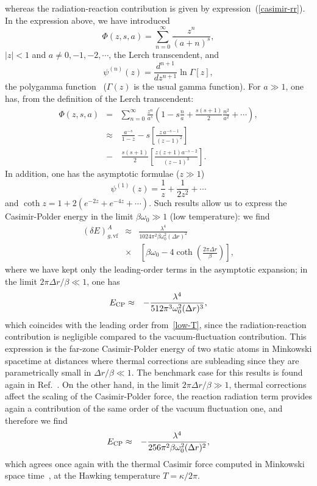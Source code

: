 \documentclass[twocolumn,prd,aps,showpacs,amsmath,amssymb]{revtex4-1}
\def\beq{\begin{equation}}
\def\eeq{\end{equation}}
\def\bea{\begin{eqnarray}}
\def\eea{\end{eqnarray}}
\def\nn{\nonumber}
\begin{document}
whereas the radiation-reaction contribution is given by
expression~(\ref{casimir-rr}). In the expression above, we have introduced
$$
\Phi(z,s,a) = \sum_{n=0}^{\infty}\frac{z^{n}}{(a+n)^s},
$$
$|z| < 1$ and $a \neq 0, -1, -2, \cdots$,  the Lerch transcendent, and
$$
\psi^{(n)}(z) = \frac{d^{n+1}}{dz^{n+1}} \ln \Gamma[z],
$$
 the polygamma function~\cite{abram} ($\Gamma(z)$ is the usual gamma function). For $a \gg 1$, one has, from the definition of the Lerch transcendent:
%
\bea
\Phi(z,s,a) &=& \sum_{n=0}^{\infty}\frac{z^{n}}{a^s}\left(1 - s\frac{n}{a} + \frac{s(s+1)}{2}\frac{n^2}{a^2} + \cdots \right),
\nn\\
&\approx&\,\frac{a^{-s}}{1-z} - s\left[\frac{z\,a^{-s-1}}{(z-1)^2}\right] 
\nn\\
&-&\, \frac{s(s+1)}{2}\left[\frac{z (z+1)a^{-s-2}}{(z-1)^3}\right].
\eea
%
In addition, one has the asymptotic formulae ($z \gg 1$)
%
\beq
\psi^{(1)}(z) = \frac{1}{z} + \frac{1}{2z^2} + \cdots
\eeq
%
and $\coth z = 1 + 2 (e^{-2z} + e^{-4z} + \cdots)$. Such results allow
us to express the Casimir-Polder energy in the limit $\beta\omega_0
\gg 1$ (low temperature): we find 
%
\bea
(\delta E)^{A}_{g,\textrm{vf}} &\approx& \frac{\lambda^4}{1024\pi^2\beta \omega _0^2 (\Delta r)^2}
\nn\\
&\times&\,\left[\beta  \omega _0-4 \coth \left(\frac{2 \pi  \Delta r}{\beta }\right)\right],
\label{low-T}
\eea
%
where we have kept only the leading-order terms in the  asymptotic expansion; in the limit $2\pi \Delta r/\beta \ll 1$, one has %
\bea
E_{\rm CP} &\approx& -\frac{\lambda^4}{512\pi^3\omega _0^2 (\Delta r)^3},
\label{low-T1}
\eea
%
which coincides with the leading order from~\eqref{low-T}, since the radiation-reaction contribution is negligible compared to the vacuum-fluctuation contribution. This expression  is the far-zone Casimir-Polder energy of two static atoms in Minkowski spacetime at distances where  thermal corrections are subleading since they are parametrically small in $\Delta r/\beta\ll1$. The benchmark case for this results is found again in Ref.~\cite{marino}.  On the other hand, in the limit $2\pi \Delta r/\beta \gg 1$, thermal corrections affect the scaling of the Casimir-Polder force, the reaction radiation term provides again a contribution of the same order of the vacuum fluctuation one, and therefore we find
%
\bea
E_{\rm CP} &\approx&
-\frac{\lambda^4}{256\pi^2\beta\omega _0^2 (\Delta r)^2},
\label{low-T2}
\eea
%
 which agrees once again with the thermal Casimir force computed in Minkowski space time~\cite{marino}, at the Hawking temperature $T=\kappa/2\pi$.
\end{document}
